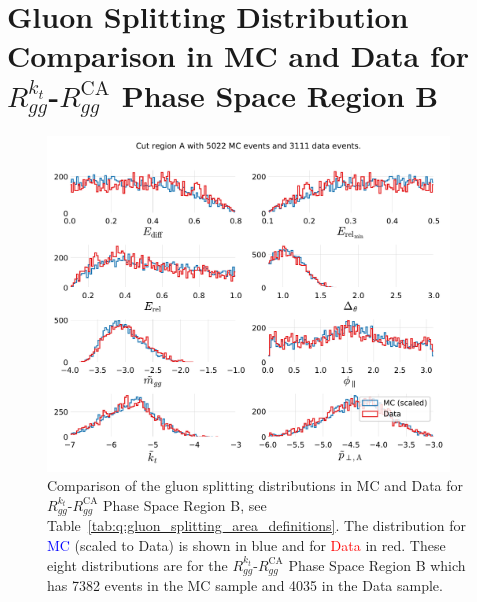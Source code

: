 \section[Gluon Splitting Distribution Comparison in MC and Data for Phase Space Region B]{Gluon Splitting Distribution Comparison in MC and Data for $R_{gg}^{k_t}$-$R_{gg}^\mathrm{CA}$ Phase Space Region B}
\begin{figure}[h!]
  \centerfloat
  \includegraphics[width=0.95\textwidth, trim=0 0 0 0, clip, page=2]{figures/quarks/gtag-R_kt_CA_histograms-down_sample=1.00-ML_vars=vertex-selection=b-ejet_min=4-n_iter_RS_lgb=99-n_iter_RS_xgb=9-cdot_cut=0.90-version=19-njet=4.pdf}
  \caption[Gluon Splitting Distribution Comparison in MC and Data for Phase Space Region B]
          {Comparison of the gluon splitting distributions in MC and Data for $R_{gg}^{k_t}$-$R_{gg}^\mathrm{CA}$ Phase Space Region B, see Table~\ref{tab:q:gluon_splitting_area_definitions}. The distribution for \textcolor{blue}{MC} (scaled to Data) is shown in blue and for \textcolor{red}{Data} in red. These eight distributions are for the $R_{gg}^{k_t}$-$R_{gg}^\mathrm{CA}$ Phase Space Region B which has \num{7382} events in the MC sample and \num{4035} in the Data sample. } 
  \label{fig:q:R_kt_CA_cut_B}
\end{figure}
\clearpage

